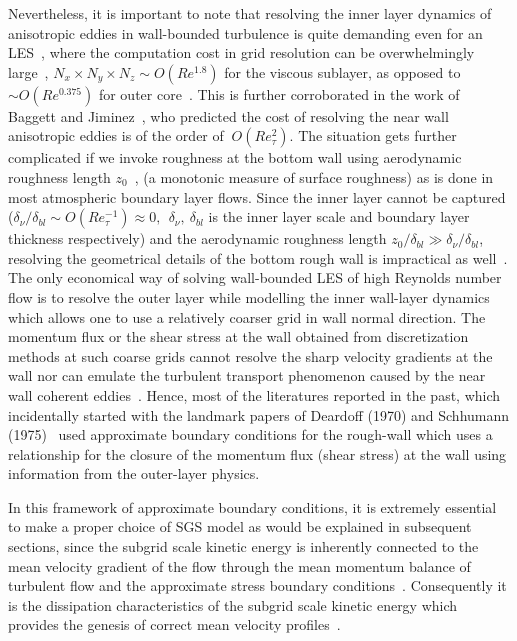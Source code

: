 \documentclass[times]{fldauth}
\begin{document}
 Nevertheless, it is important to note that resolving the inner layer dynamics of anisotropic eddies in wall-bounded turbulence is quite demanding even for an LES~\cite{pio2,lars}, where the computation cost in grid resolution can be overwhelmingly large~\cite{kav}, $N_x\times N_y\times N_z \sim O(Re^{1.8})$ for the viscous sublayer, as opposed to $\sim O(Re^{0.375})$ for outer core~\cite{chap}. This is further corroborated in the work of  Baggett and Jiminez~\cite{jimtech}, who predicted the cost of resolving the near wall anisotropic eddies is of the order of $~O(Re_{\tau}^{2})$. The situation gets further complicated if we invoke roughness at the bottom wall using aerodynamic roughness length $z_0$~\cite{porte1fun,bhag,taft,meyers2}, (a monotonic measure of surface roughness) as is done in most atmospheric boundary layer flows. Since the inner layer cannot be captured ($\delta_\nu/\delta_{bl}\sim O(Re_{\tau}^{-1}) \approx 0,\ \ \delta_{\nu},\ \delta_{bl}$ is the inner layer scale and boundary layer thickness respectively) and the aerodynamic roughness length $z_0/\delta_{bl} \gg \delta_\nu/\delta_{bl}$, resolving the geometrical details of the bottom rough wall is impractical as well~\cite{mason,porte1fun,calaf,meyers2}. The only economical way of solving wall-bounded LES of high Reynolds number flow is to resolve the outer layer while modelling the inner wall-layer dynamics which allows one to use a relatively coarser grid in wall normal direction. The momentum flux or the shear stress at the wall obtained from discretization methods at such coarse grids cannot resolve the sharp velocity gradients at the wall nor can emulate the turbulent transport phenomenon caused by the near wall coherent eddies~\cite{pio,sag,bers}. Hence, most of the literatures reported in the past, which incidentally started with the landmark papers of Deardoff (1970) and Schhumann (1975)~\cite{deardoff,schumann,grot,porte1fun,pio,meyers} used approximate boundary conditions for the rough-wall which uses a relationship for the closure of the momentum flux (shear stress) at the wall using information from the outer-layer physics.
\par
In this framework of approximate boundary conditions, it is extremely essential to make a proper choice of SGS model as would be explained in subsequent sections, since the subgrid scale kinetic energy is inherently connected to the mean velocity gradient of the flow through the mean momentum balance of turbulent flow and the approximate stress boundary conditions~\cite{meyers2}. Consequently it is the dissipation characteristics of the subgrid scale kinetic energy which provides the genesis of correct mean velocity profiles~\cite{katz}.
\end{document}
